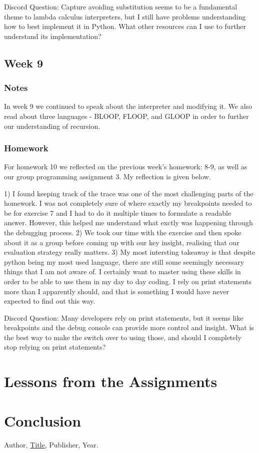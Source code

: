 \documentclass{article}
\theoremstyle{theorem}
\theoremstyle{definition}
\theoremstyle{remark}
\begin{document}
Discord Question: Capture avoiding substitution seems to be a fundamental theme to lambda calculus interpreters, but I still have problems understanding how to best implement it in Python. What other resources can I use to further understand its implementation?

\subsection{Week 9}
\subsubsection*{Notes}
In week 9 we continued to speak about the interpreter and modifying it. We also read about three languages - BLOOP, FLOOP, and GLOOP in order to further our understanding of recursion. 

\subsubsection*{Homework}
For homework 10 we reflected on the previous week's homework: 8-9, as well as our group programming assignment 3. My reflection is given below.

1) I found keeping track of the trace was one of the most challenging parts of the homework. I was not completely sure of where exactly my breakpoints needed to be for exercise 7 and I had to do it multiple times to formulate a readable answer. However, this helped me understand what exctly was happening through the debugging process.
2) We took our time with the exercise and then spoke about it as a group before coming up with our key insight, realising that our evaluation strategy really matters.
3) My most intersting takeaway is that despite python being my most used language, there are still some seemingly necessary things that I am not aware of. I certainly want to master using these skills in order to be able to use them in my day to day coding. I rely on print statements more than I apparently should, and that is something I would have never expected to find out this way.

Discord Question: Many developers rely on print statements, but it seems like breakpoints and the debug console can provide more control and insight. What is the best way to make the switch over to using those, and should I completely stop relying on print statements?


\section{Lessons from the Assignments}


\section{Conclusion}\label{conclusion}


\begin{thebibliography}{99}
 Author, \href{https://en.wikipedia.org/wiki/LaTeX}{Title}, Publisher, Year.
\end{thebibliography}
\end{document}
